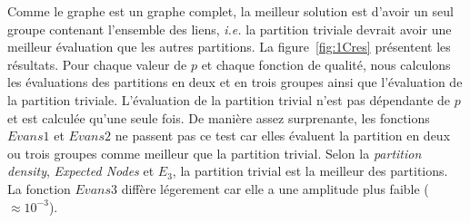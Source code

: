 Comme le graphe est un graphe complet, la meilleur solution est d'avoir un seul groupe contenant l'ensemble des liens, \textit{i.e.} la partition triviale devrait avoir une meilleur évaluation que les autres partitions.
La figure~\ref{fig:1Cres} présentent les résultats.
Pour chaque valeur de $p$ et chaque fonction de qualité, nous calculons les évaluations des partitions en deux et en trois groupes ainsi que l'évaluation de la partition triviale.
L'évaluation de la partition trivial n'est pas dépendante de $p$ et est calculée qu'une seule fois.
De manière assez surprenante, les fonctions $Evans1$ et $Evans2$ ne passent pas ce test car elles évaluent la partition en deux ou trois groupes comme meilleur que la partition trivial.
Selon la \emph{partition density}, \emph{Expected Nodes} et $E_3$, la partition trivial est la meilleur des partitions.
La fonction $Evans3$ diffère légerement car elle a une amplitude plus faible ($\approx 10^{-3}$).

